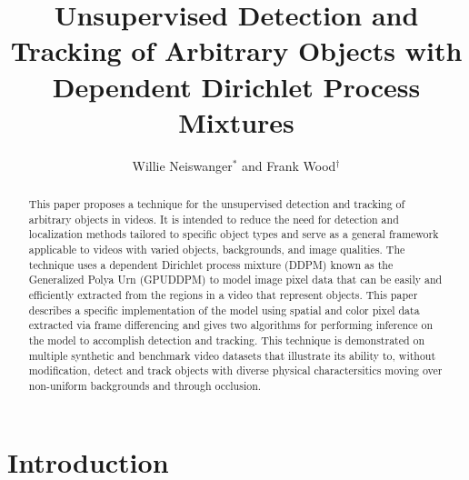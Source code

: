 \documentclass[twocolumn, final]{svjour3}
\begin{document}

\title{Unsupervised Detection and Tracking of Arbitrary Objects with Dependent Dirichlet Process Mixtures}
\author{Willie Neiswanger$^{*}$ and Frank Wood$^{\dagger}$}
\date{}  %
\maketitle



\begin{abstract}
This paper proposes a technique for the unsupervised detection and tracking of arbitrary objects in videos. It is intended to reduce the need for detection and localization methods tailored to specific object types and serve as a general framework applicable to videos with varied objects, backgrounds, and image qualities. The technique uses a dependent Dirichlet process mixture (DDPM) known as the Generalized Polya Urn (GPUDDPM) to model image pixel data that can be easily and efficiently extracted from the regions in a video that represent objects. This paper describes a specific implementation of the model using spatial and color pixel data extracted via frame differencing and gives two algorithms for performing inference on the model to accomplish detection and tracking. This technique is demonstrated on multiple synthetic and benchmark video datasets that illustrate its ability to, without modification, detect and track objects with diverse physical charactersitics moving over non-uniform backgrounds and through occlusion.
\end{abstract}




\section{Introduction}
\label{sec:introduction}
\end{document}
